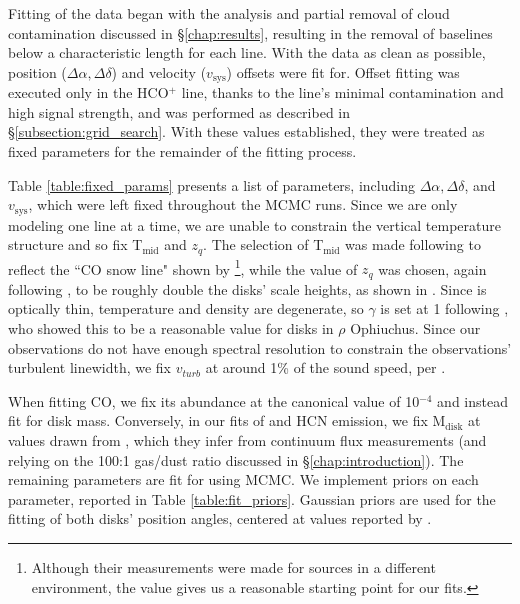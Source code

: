 Fitting of the data began with the analysis and partial removal of cloud contamination discussed in \S\ref{chap:results}, resulting in the removal of baselines below a characteristic length for each line. With the data as clean as possible, position ($\Delta \alpha, \Delta \delta$) and velocity ($v_\text{sys}$) offsets were fit for. Offset fitting was executed only in the HCO$^+$ line, thanks to the line's minimal contamination and high signal strength, and was performed as described in \S\ref{subsection:grid_search}. With these values established, they were treated as fixed parameters for the remainder of the fitting process.


Table \ref{table:fixed_params} presents a list of parameters, including $\Delta \alpha, \Delta \delta$, and $v_\text{sys}$, which were left fixed throughout the MCMC runs. Since we are only modeling one line at a time, we are unable to constrain the vertical temperature structure and so fix T$_\text{mid}$ and $z_q$. The selection of T$_\text{mid}$ was made following \citet{Factor2017} to reflect the ``CO snow line" shown by \citet{Qi2011}\footnote{Although their measurements were made for sources in a different environment, the value gives us a reasonable starting point for our fits.}, while the value of $z_q$ was chosen, again following \citet{Factor2017}, to be roughly double the disks' scale heights, as shown in \citet{Rosenfeld2013}. Since \hco is optically thin, temperature and density are degenerate, so $\gamma$ is set at 1 following \cite{Andrews2009}, who showed this to be a reasonable value for disks in $\rho$ Ophiuchus. Since our observations do not have enough spectral resolution to constrain the observations' turbulent linewidth, we fix $v_{turb}$ at around 1\% of the sound speed, per \citet{Flaherty2015}.

When fitting CO, we fix its abundance at the canonical value of 10$^{-4}$ and instead fit for disk mass. Conversely, in our fits of \hco and HCN emission, we fix M$_\text{disk}$ at values drawn from \cite{Williams2014}, which they infer from continuum flux measurements (and relying on the 100:1 gas/dust ratio discussed in \S\ref{chap:introduction}). The remaining parameters are fit for using MCMC. We implement priors on each parameter, reported in Table \ref{table:fit_priors}. Gaussian priors are used for the fitting of both disks' position angles, centered at values reported by \cite{Williams2014}.


